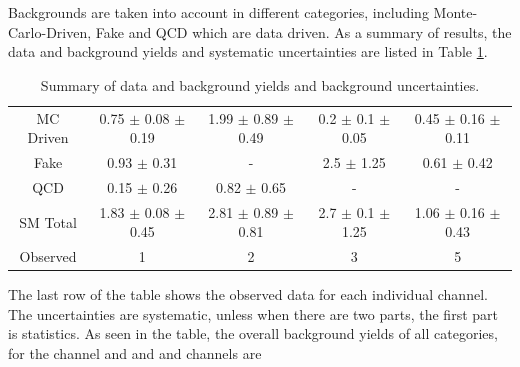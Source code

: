 Backgrounds are taken into account in different categories, including Monte-Carlo-Driven, Fake and QCD which are data driven.
As a summary of results, the data and background yields and systematic uncertainties are listed in Table \ref{tbl:yieldSysSummary}. 
\begin{table}[h]
\begin{center}
\begin{tabular}{c|c|c|c|c}
\hline
\hline
		& \tauTau\binone & \tauTau\bintwo & \eTau\binone & \muTau\binone \\
\hline
MC Driven &  0.75 $\pm$ 0.08 $\pm$ 0.19 & 1.99 $\pm$ 0.89 $\pm$ 0.49  & 0.2 $\pm$ 0.1 $\pm$ 0.05 & 0.45 $\pm$ 0.16  $\pm$ 0.11\\
Fake      &     0.93 $\pm$ 0.31         &           -                 &     2.5 $\pm$ 1.25       &      0.61 $\pm$  0.42\\
QCD       &     0.15 $\pm$ 0.26         &         0.82 $\pm$ 0.65     &           -              &            -       \\
\hline
SM Total  & 1.83 $\pm$ 0.08 $\pm$ 0.45 & 2.81  $\pm$ 0.89 $\pm$0.81  & 2.7 $\pm$ 0.1 $\pm$ 1.25 & 1.06 $\pm$ 0.16  $\pm$ 0.43\\
\hline
\hline
Observed   & 1     & 2     & 3   & 5 \\  
\hline
\hline
\end{tabular}
\caption{Summary of data and background yields and background uncertainties.}
\label{tbl:yieldSysSummary}
\end{center}
\end{table}
The last row of the table shows the observed data for  each individual channel.  The uncertainties are systematic, unless when there are 
two parts, the first part is statistics.
As seen in the table, the overall background yields of all categories, 
for the \tauTau channel \binone and \bintwo and \eTau and \muTau channels are  
